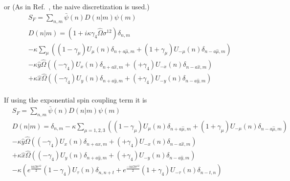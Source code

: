 or (As in Ref.~\cite{rotation}, the naive discretization is used.)
\textcolor[rgb]{0,0,0.8}{
\begin{equation}
\begin{split}
&S_F=\sum _{n,m}\bar{\psi }(n) D(n|m) \psi(m)\\
&D(n|m)=\left(1+i\kappa \gamma _4 \hat{\Omega} \sigma ^{12}\right)\delta _{n,m}\\
&-\kappa\sum _{\mu}\left((1-\gamma _{\mu})U_{\mu}(n)\delta _{n+a\hat{\mu},m}+(1+\gamma _{\mu})U_{-\mu}(n)\delta _{n-a\hat{\mu},m}\right)\\
&-\kappa \hat{y}\hat{\Omega} \left((-\gamma _4)U_{x}(n)\delta _{n+a\hat{x},m}+(+\gamma _4)U_{-x}(n)\delta _{n-a\hat{x},m}\right)\\
&+\kappa \hat{x}\hat{\Omega} \left((-\gamma _4)U_{y}(n)\delta _{n+a\hat{y},m}+(+\gamma _4)U_{-y}(n)\delta _{n-a\hat{y},m}\right)\\
\end{split}
\end{equation}
}

If using the exponential spin coupling term it is
\textcolor[rgb]{0,0,0.8}{
\begin{equation}
\begin{split}
&S_F=\sum _{n,m}\bar{\psi }(n) D(n|m) \psi(m)\\
&D(n|m)=\delta _{n,m}-\kappa\sum _{\mu = 1,2,3}\left((1-\gamma _{\mu})U_{\mu}(n)\delta _{n+a\hat{\mu},m}+(1+\gamma _{\mu})U_{-\mu}(n)\delta _{n-a\hat{\mu},m}\right)\\
&-\kappa \hat{y}\hat{\Omega} \left((-\gamma _4)U_{x}(n)\delta _{n+a\hat{x},m}+(+\gamma _4)U_{-x}(n)\delta _{n-a\hat{x},m}\right)\\
&+\kappa \hat{x}\hat{\Omega} \left((-\gamma _4)U_{y}(n)\delta _{n+a\hat{y},m}+(+\gamma _4)U_{-y}(n)\delta _{n-a\hat{y},m}\right)\\
&-\kappa \left(e^{\frac{ia\Omega \sigma ^{12}}{2}}(1-\gamma _4)U_{\tau}(n)\delta _{n,n+t} +e^{\frac{-ia\Omega \sigma ^{12}}{2}}(1+\gamma _4) U_{-\tau}(n)\delta _{n-t,n}\right)\\
\end{split}
\end{equation}
}

